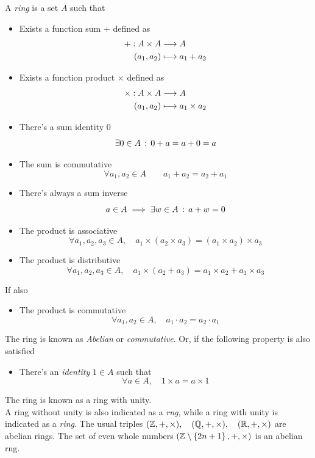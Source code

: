 \documentclass[../complete.tex]{subfiles}
\begin{document}
\begin{dfn}[Ring]
	A \textit{ring} is a set $A$ such that
	\begin{itemize}
	\item Exists a function sum $+$ defined as
		\begin{equation*}
			\begin{aligned}
				+:A\times A&\overset{}{\longrightarrow} A\\
				(a_1, a_2)&\longmapsto a_1+a_2
			\end{aligned}
		\end{equation*}
	\item Exists a function product $\times$ defined as
		\begin{equation*}
			\begin{aligned}
				\times:A\times A&\overset{}{\longrightarrow} A\\
				(a_1, a_2)&\longmapsto a_1\times a_2
			\end{aligned}
		\end{equation*}
	\item There's a sum identity $0$ $$\exists0\in A\, :\, 0+a=a+0=a$$
	\item The sum is commutative $$\forall a_1, a_2\in A\qquad a_1+a_2=a_2+a_1$$
	\item There's always a sum inverse $$a\in A\implies\exists w\in A\, :\,  a+w=0$$
	\item The product is associative $$\forall a_1, a_2, a_3\in A, \quad a_1\times(a_2\times a_3)=(a_1\times a_2)\times a_3$$
	\item The product is distributive $$\forall a_1, a_2, a_3\in A, \quad a_1\times(a_2+a_3)=a_1\times a_2+a_1\times a_3$$
	\end{itemize}
	If also
	\begin{itemize}
	\item The product is commutative $$\forall a_1, a_2\in A, \quad a_1\cdot a_2=a_2\cdot a_1$$
	\end{itemize}
	The ring is known as \textit{Abelian} or \textit{commutative}.
	Or, if the following property is also satisfied
	\begin{itemize}
	\item There's an \textit{identity} $1\in A$ such that
		$$\forall a\in A, \quad 1\times a= a\times 1$$
	\end{itemize}
	The ring is known as a ring with unity.\\
	A ring without unity is also indicated as a \textit{rng}, while a ring with unity is indicated as a \textit{ring}.
	The usual triples $(\mathbb{Z}, +, \times), \quad (\mathbb{Q}, +, \times), \quad (\mathbb{R}, +, \times)$ are abelian rings. The set of even whole numbers $(\mathbb{Z}\setminus\left\{ 2n+1 \right\}, +, \times)$ is an abelian rng.
\end{dfn}
\end{document}

